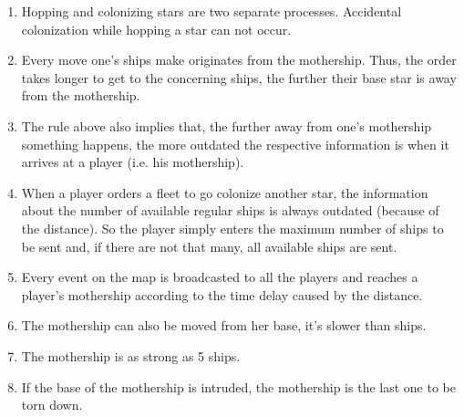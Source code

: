 \begin{enumerate}
	\item Hopping and colonizing stars are two separate processes. Accidental colonization while hopping a star can not occur.
	\item Every move one’s ships make originates from the mothership. Thus, the order takes longer to get to the concerning ships, the further their base star is away from the mothership.
	\item The rule above also implies that, the further away from one's mothership something happens, the more outdated the respective information is when it arrives at a player (i.e. his mothership).
	\item When a player orders a fleet to go colonize another star, the information about the number of available regular ships is always outdated (because of the distance). So the player simply enters the maximum number of ships to be sent and, if there are not that many, all available ships are sent.
	\item Every event on the map is broadcasted to all the players and reaches a player's mothership according to the time delay caused by the distance.
	\item The mothership can also be moved from her base, it's slower than ships.
	\item The mothership is as strong as 5 ships.
	\item If the base of the mothership is intruded, the mothership is the last one to be torn down.
\end{enumerate}
